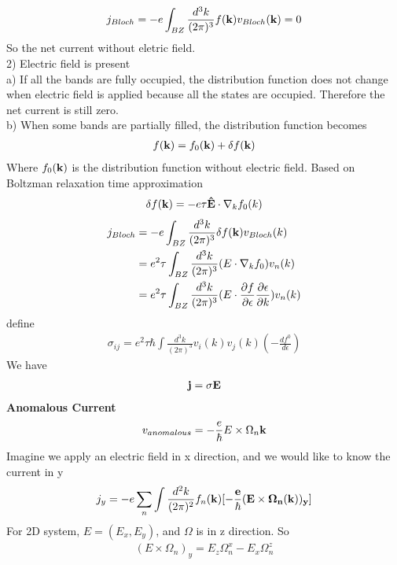 \documentclass[a4paper]{article}
\begin{document}
\begin{align*}
j_{Bloch} = -e \int_{BZ}\frac{d^3k}{(2\pi)^3} f({\bf k}) v_{Bloch}({\bf k})  = 0
\end{align*}
So the net current without eletric field.\\
2) Electric field is present\\
a) If all the bands are fully occupied, the distribution function does not change when electric field is applied because all the states are occupied. Therefore the net current is still zero.\\
b) When some bands are partially filled, the distribution function becomes
\begin{align*}
f({\bf k}) = f_0({\bf k}) + \delta f({\bf k})
\end{align*}
Where $f_0({\bf k})$ is the distribution function without electric field.
Based on Boltzman relaxation time approximation
\begin{align*}
\delta f({\bf k}) = -e \tau {\bf \hat E} \cdot \nabla_k f_0(k)
\end{align*}
\begin{align*}
j_{Bloch} & = -e \int_{BZ}\frac{d^3k}{(2\pi)^3} \delta f({\bf k}) v_{Bloch}(k) \\
& = e^2 \tau \int_{BZ}\frac{d^3k}{(2\pi)^3}  (E \cdot \nabla_k f_0) v_n(k) \\
& =e^2 \tau \int_{BZ}\frac{d^3k}{(2\pi)^3}  (E \cdot \frac{\partial f}{\partial \epsilon} \frac{\partial \epsilon}{\partial k} ) v_n(k)
\end{align*} 
define 
\begin{align*}
\sigma_{ij} = e^2 \tau \hbar \int \frac{d^3k}{(2\pi)^3} v_i(k) v_j(k) (-\frac{d f^0}{d \epsilon})
\end{align*}
We have
\begin{align*}
{\bf j} = \sigma {\bf E}
\end{align*}
{\bf Anomalous Current}\\
\begin{align*}
v_{anomalous} = - \frac{e}{\hbar} E \times \Omega_n{\bf k}
\end{align*}
Imagine we apply an electric field in x direction, and we would like to know the current in y
\begin{align*}
j_y = -e \sum_n \int \frac{d^2k}{(2\pi)^2}f_n(\bf k)[-\frac{e}{\hbar}(E \times \Omega_n({\bf k}))_y]
\end{align*}
For 2D system, $E = (E_x, E_y)$, and $\Omega$ is in z direction. So
\begin{align*}
(E \times \Omega_n)_y = E_z \Omega_n^x - E_x \Omega_n^z
\end{align*}
\end{document}
